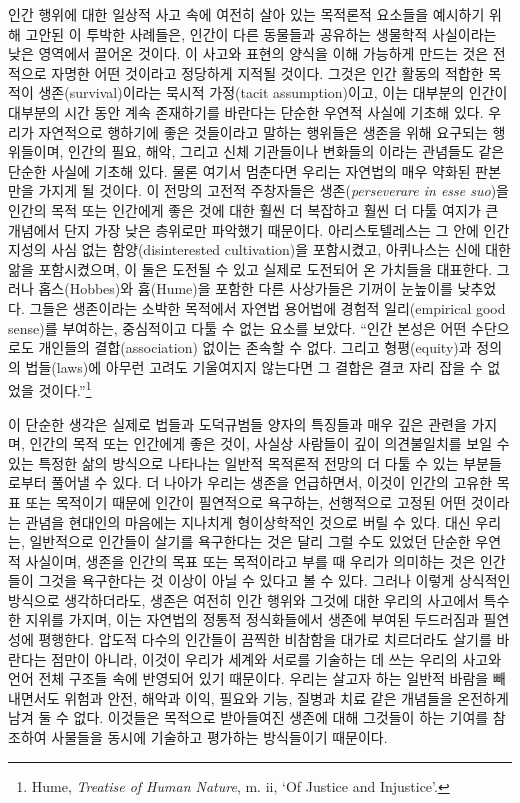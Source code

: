 인간 행위에 대한 일상적 사고 속에 여전히 살아 있는 목적론적 요소들을
예시하기 위해 고안된 이 투박한 사례들은, 인간이 다른 동물들과 공유하는
생물학적 사실이라는 낮은 영역에서 끌어온 것이다. 이 사고와 표현의 양식을
이해 가능하게 만드는 것은 전적으로 자명한 어떤 것이라고 정당하게 지적될
것이다. 그것은 인간 활동의 적합한 목적이 생존(survival)이라는 묵시적
가정(tacit assumption)이고, 이는 대부분의 인간이 대부분의 시간 동안 계속
존재하기를 바란다는 단순한 우연적 사실에 기초해 있다. 우리가 자연적으로
행하기에 좋은 것들이라고 말하는 행위들은 생존을 위해 요구되는
행위들이며, 인간의 필요, 해악, 그리고 신체 기관들이나 변화들의
이라는 관념들도 같은 단순한 사실에 기초해 있다.
물론 여기서 멈춘다면 우리는 자연법의 매우 약화된 판본만을 가지게 될
것이다. 이 전망의 고전적 주창자들은 생존(\emph{perseverare in esse
suo})을 인간의 목적 또는 인간에게 좋은 것에 대한 훨씬 더 복잡하고 훨씬
더 다툴 여지가 큰 개념에서 단지 가장 낮은 층위로만 파악했기 때문이다.
아리스토텔레스는 그 안에 인간 지성의 사심 없는 함양(disinterested
cultivation)을 포함시켰고, 아퀴나스는 신에 대한 앎을 포함시켰으며, 이
둘은 도전될 수 있고 실제로 도전되어 온 가치들을 대표한다. 그러나
홉스(Hobbes)와 흄(Hume)을 포함한 다른 사상가들은 기꺼이 눈높이를
낮추었다. 그들은 생존이라는 소박한 목적에서 자연법 용어법에 경험적
일리(empirical good sense)를 부여하는, 중심적이고 다툴 수 없는 요소를
보았다. “인간 본성은 어떤 수단으로도 개인들의 결합(association) 없이는
존속할 수 없다. 그리고 형평(equity)과 정의의 법들(laws)에 아무런 고려도
기울여지지 않는다면 그 결합은 결코 자리 잡을 수 없었을
것이다.”\footnote{Hume, \emph{Treatise of Human Nature}, m. ii, `Of
  Justice and Injustice'.}

이 단순한 생각은 실제로 법들과 도덕규범들 양자의 특징들과 매우 깊은
관련을 가지며, 인간의 목적 또는 인간에게 좋은 것이, 사실상 사람들이 깊이
의견불일치를 보일 수 있는 특정한 삶의 방식으로 나타나는 일반적 목적론적
전망의 더 다툴 수 있는 부분들로부터 풀어낼 수 있다. 더 나아가 우리는
생존을 언급하면서, 이것이 인간의 고유한 목표 또는 목적이기 때문에 인간이
필연적으로 욕구하는, 선행적으로 고정된 어떤 것이라는 관념을 현대인의
마음에는 지나치게 형이상학적인 것으로 버릴 수 있다. 대신 우리는,
일반적으로 인간들이 살기를 욕구한다는 것은 달리 그럴 수도 있었던 단순한
우연적 사실이며, 생존을 인간의 목표 또는 목적이라고 부를 때 우리가
의미하는 것은 인간들이 그것을 욕구한다는 것 이상이 아닐 수 있다고 볼 수
있다. 그러나 이렇게 상식적인 방식으로 생각하더라도, 생존은 여전히 인간
행위와 그것에 대한 우리의 사고에서 특수한 지위를 가지며, 이는 자연법의
정통적 정식화들에서 생존에 부여된 두드러짐과 필연성에 평행한다. 압도적
다수의 인간들이 끔찍한 비참함을 대가로 치르더라도 살기를 바란다는 점만이
아니라, 이것이 우리가 세계와 서로를 기술하는 데 쓰는 우리의 사고와 언어
전체 구조들 속에 반영되어 있기 때문이다. 우리는 살고자 하는 일반적
바람을 빼내면서도 위험과 안전, 해악과 이익, 필요와 기능, 질병과 치료
같은 개념들을 온전하게 남겨 둘 수 없다. 이것들은 목적으로 받아들여진
생존에 대해 그것들이 하는 기여를 참조하여 사물들을 동시에 기술하고
평가하는 방식들이기 때문이다.

